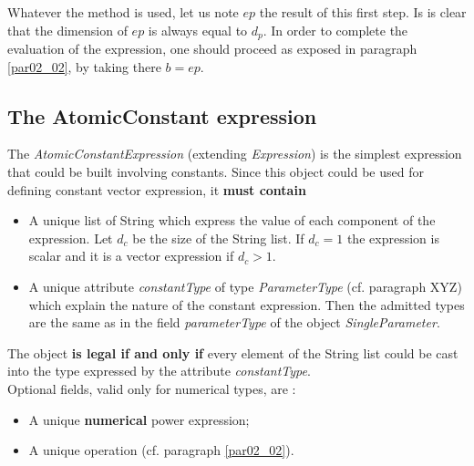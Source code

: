 \documentclass[a4paper,11pt] {article}
\begin{document}
Whatever the method is used, let us note $ep$ the result of this first step. Is is clear that the dimension of $ep$ 
is always equal to $d_p$. In order to complete the evaluation of the expression, one should proceed as exposed in paragraph \ref{par02_02}, by taking there $b=ep$.

\subsection{The AtomicConstant expression}\label{par02_03}
The {\it AtomicConstantExpression} (extending {\it Expression}) is the simplest expression that could be built involving constants. Since this object could be used for defining constant vector expression, it {\bf must contain} 
\begin{itemize}
\item A unique list of String which express the value of each component of the expression. Let $d_c$ be the size of the String list. If $d_c=1$ the expression is scalar and it is a vector expression if $d_c>1$. 
\item A unique attribute {\it constantType} of type {\it ParameterType} (cf. paragraph XYZ) which explain the nature of the constant expression. Then the admitted types are the same as in the field {\it parameterType} of the object {\it SingleParameter}. 
\end{itemize}
The object {\bf is legal if and only if} every element of the String list could be cast into the type expressed by the attribute {\it constantType}.\\

Optional fields, valid only for numerical types, are : 
\begin{itemize}
\item A unique {\bf numerical} power expression;
\item A unique operation (cf. paragraph \ref{par02_02}).
\end{itemize}
\end{document}
